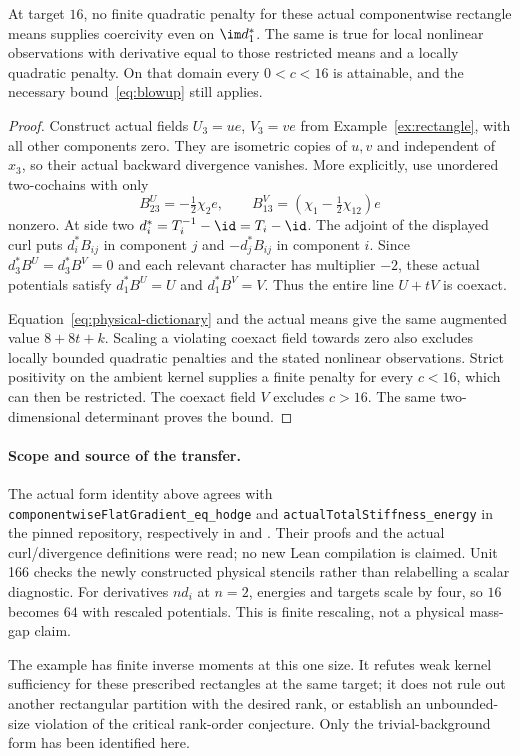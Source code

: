 \begin{proposition}\label{prop:coexact}
At target $16$, no finite quadratic penalty for these actual componentwise
rectangle means supplies coercivity even on $\im d_1^*$. The same is true
for local nonlinear observations with derivative equal to those restricted
means and a locally quadratic penalty. On that domain every $0<c<16$ is
attainable, and the necessary bound~\eqref{eq:blowup} still applies.
\end{proposition}
\begin{proof}
Construct actual fields $U_3=ue$, $V_3=ve$ from Example~\ref{ex:rectangle},
with all other components zero. They are isometric copies of $u,v$ and
independent of $x_3$, so their actual backward divergence vanishes.
More explicitly, use unordered two-cochains with only
\[
 B^U_{23}=-\tfrac12\chi_2 e,\qquad
 B^V_{13}=(\chi_1-\tfrac12\chi_{12})e
\]
nonzero. At side two $d_i^*=T_i^{-1}-\id=T_i-\id$. The adjoint of the
displayed curl puts $d_i^*B_{ij}$ in component $j$ and $-d_j^*B_{ij}$ in
component $i$. Since $d_3^*B^U=d_3^*B^V=0$ and each relevant character
has multiplier $-2$, these actual potentials satisfy $d_1^*B^U=U$ and
$d_1^*B^V=V$. Thus the entire line $U+tV$ is coexact.

Equation~\eqref{eq:physical-dictionary} and the actual means give the same
augmented value $8+8t+k$. Scaling a violating coexact field towards zero
also excludes locally bounded quadratic penalties and the stated nonlinear
observations. Strict positivity on the ambient kernel supplies a finite
penalty for every $c<16$, which can then be restricted. The coexact field
$V$ excludes $c>16$. The same two-dimensional determinant proves the bound.
\end{proof}

\paragraph{Scope and source of the transfer.}
The actual form identity above agrees with
\texttt{componentwiseFlatGradient\_eq\_hodge} and
\texttt{actualTotalStiffness\_energy} in the pinned repository, respectively
in  and
. Their proofs and the
actual curl/divergence definitions were read; no new Lean compilation is
claimed. Unit 166 checks the newly constructed physical stencils rather
than relabelling a scalar diagnostic. For derivatives $nd_i$ at $n=2$,
energies and targets scale by four, so $16$ becomes $64$ with rescaled
potentials. This is finite rescaling, not a physical mass-gap claim.

The example has finite inverse moments at this one size. It refutes weak
kernel sufficiency for these prescribed rectangles at the same target;
it does not rule out another rectangular partition with the desired rank,
or establish an unbounded-size violation of the critical rank-order
conjecture. Only the trivial-background form has been identified here.
